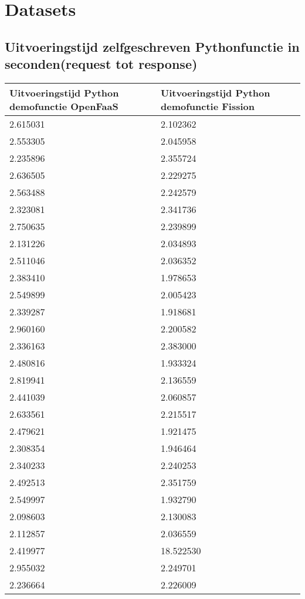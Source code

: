 \section{Datasets}
\subsection{Uitvoeringstijd  zelfgeschreven Pythonfunctie in seconden(request tot response)}
\label{sec:uitvoeringstijd-demofunctie}
\begin{longtable}[c]{ll}
    \textbf{Uitvoeringstijd Python demofunctie OpenFaaS} & \textbf{Uitvoeringstijd Python demofunctie Fission} \\
    \endfirsthead
    \endhead
    2.615031 & 2.102362 \\
    2.553305 & 2.045958 \\
    2.235896 & 2.355724 \\
    2.636505 & 2.229275 \\
    2.563488 & 2.242579 \\
    2.323081 & 2.341736 \\
    2.750635 & 2.239899 \\
    2.131226 & 2.034893 \\
    2.511046 & 2.036352 \\
    2.383410 & 1.978653 \\
    2.549899 & 2.005423 \\
    2.339287 & 1.918681 \\
    2.960160 & 2.200582 \\
    2.336163 & 2.383000 \\
    2.480816 & 1.933324 \\
    2.819941 & 2.136559 \\
    2.441039 & 2.060857 \\
    2.633561 & 2.215517 \\
    2.479621 & 1.921475 \\
    2.308354 & 1.946464 \\
    2.340233 & 2.240253 \\
    2.492513 & 2.351759 \\
    2.549997 & 1.932790 \\
    2.098603 & 2.130083 \\
    2.112857 & 2.036559 \\
    2.419977 & 18.522530 \\
    2.955032 & 2.249701 \\
    2.236664 & 2.226009 \\

\end{longtable}
